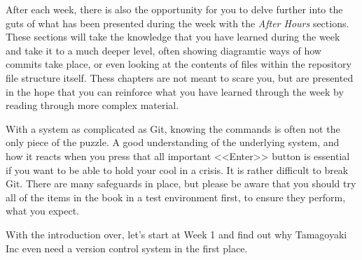 After each week, there is also the opportunity for you to delve further into the guts of what has been presented during the week with the \emph{After Hours} sections.  These sections will take the knowledge that you have learned during the week and take it to a much deeper level, often showing diagramtic ways of how commits take place, or even looking at the contents of files within the repository file structure itself.  Thess chapters are not meant to scare you, but are presented in the hope that you can reinforce what you have learned through the week by reading through more complex material.

With a system as complicated as Git, knowing the commands is often not the only piece of the puzzle.  A good understanding of the underlying system, and how it reacts when you press that all important <<Enter>> button is essential if you want to be able to hold your cool in a crisis.  It is rather difficult to break Git.  There are many safeguards in place, but please be aware that you should try all of the items in the book in a test environment first, to ensure they perform, what you expect.  

With the introduction over, let's start at Week 1 and find out why Tamagoyaki Inc even need a version control system in the first place.
